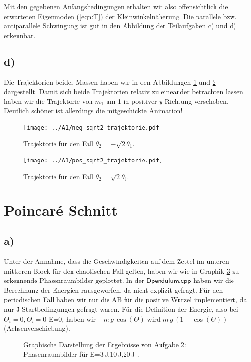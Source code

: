 Mit den gegebenen Anfangsbedingungen erhalten wir also offensichtlich die erwarteten Eigenmoden
(\ref{eqn:T}) der Kleinwinkelnäherung. Die parallele bzw. antiparallele Schwingung ist gut in den
Abbildung der Teilaufgaben c) und d) erkennbar.

\subsection*{d)}
Die Trajektorien beider Massen haben wir in den Abbildungen \ref{fig:neg_traj} und \ref{fig:pos_traj}
dargestellt. Damit sich beide Trajektorien relativ zu eineander betrachten lassen haben wir die
Trajektorie von $m_1$ um 1 in positiver $y$-Richtung verschoben. Deutlich schöner ist allerdings die
mitgeschickte Animation!
\begin{figure}
	\centering
	\texttt{[image: ../A1/neg\_sqrt2\_trajektorie.pdf]}
	\caption{Trajektorie für den Fall $\theta_2 = -\sqrt{2}\theta_1$.}
	\label{fig:neg_traj}
\end{figure}
\begin{figure}
	\centering
	\texttt{[image: ../A1/pos\_sqrt2\_trajektorie.pdf]}
	\caption{Trajektorie für den Fall $\theta_2 = \sqrt{2}\theta_1$.}
	\label{fig:pos_traj}
\end{figure}

\section*{Poincar\'{e} Schnitt}
\subsection*{a)}
Unter der Annahme, dass die Geschwindigkeiten auf dem Zettel im unteren mittleren Block für den chaotischen Fall gelten, haben wir wie in Graphik \ref{fig:OsziC1} zu erkennende Phasenraumbilder geplottet. In der $\textsf{Dpendulum.cpp}$ haben wir die Berechnung der Energien rausgeworfen, da nicht explizit gefragt. Für den periodischen Fall haben wir nur die AB für die positive Wurzel implementiert, da nur 3 Startbedingungen gefragt waren. Für die Definition der Energie, also bei $\Theta_i = 0, \dot{\Theta_i} = 0$ E=0, haben wir $-m\,g\,\cos(\Theta)$ wird $m\,g\,(1-\cos(\Theta))$ (Achsenverschiebung).

\begin{landscape}
	\begin{figure}
		\caption{Graphische Darstellung der Ergebnisse von Aufgabe 2: Phasenraumbilder für E=3$\,$J,10$\,$J,20$\,$J .}
		\label{fig:OsziC1}
	\end{figure}
\end{landscape} 
